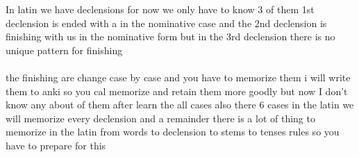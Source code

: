 In latin we have declensions for now we only have to know 3 of them 
1st declension is ended with a in the nominative case 
and the 2nd declension is finishing with us in the nominative form but 
in the 3rd declension there is no unique pattern for finishing
\\ \\
the finishing are change case by case and you have to memorize them i will
write them to anki so you cal memorize and retain them more goodly but now
I don't know any about of them after learn the all cases also there 6 cases in the 
latin we will memorize every declension and a remainder there is a lot of thing to 
memorize in the latin from words to declension to stems to tenses rules so you have to 
prepare for this
\\\\ 
